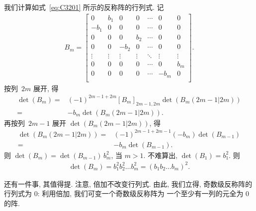 \documentclass[../libro.tex]{subfiles}
\begin{document}
我们计算如式~\eqref{eq:C3201} 所示的反称阵的行列式.
记
\begin{align*}
    B_m =
    \begin{bmatrix}
        0      & b_1    & 0      & 0      & \cdots & 0      & 0      \\
        -b_1   & 0      & 0      & 0      & \cdots & 0      & 0      \\
        0      & 0      & 0      & b_2    & \cdots & 0      & 0      \\
        0      & 0      & -b_2   & 0      & \cdots & 0      & 0      \\
        \vdots & \vdots & \vdots & \vdots & \ddots & \vdots & \vdots \\
        0      & 0      & 0      & 0      & \cdots & 0      & b_m    \\
        0      & 0      & 0      & 0      & \cdots & -b_m   & 0      \\
    \end{bmatrix}.
\end{align*}
按列~\(2m\) 展开, 得
\begin{align*}
    \det {(B_m)}
    = {} &
    (-1)^{2m-1+2m} [B_m]_{2m-1,2m} \det {(B_m ({2m-1}|{2m}))}
    \\
    = {} &
    {-} b_m \det {(B_m ({2m-1}|{2m}))}.
\end{align*}
再按列~\(2m-1\) 展开 \(\det {(B_m ({2m-1}|{2m}))}\), 得
\begin{align*}
    \det {(B_m ({2m-1}|{2m}))}
    = {} &
    (-1)^{2m-1+2m-1} (-b_m) \det {(B_{m-1})}
    \\
    = {} &
    {-} b_m \det {(B_{m-1})}.
\end{align*}
则 \(\det {(B_m)} = \det {(B_{m-1})}\, b_m^2\),
当 \(m > 1\).
不难算出, \(\det {(B_1)} = b_1^2\).
则
\begin{align*}
    \det {(B_m)} = b_1^2 b_2^2 \dots b_m^2
    = (b_1 b_2 \dots b_m)^2.
\end{align*}

还有一件事, 其值得提.
注意, 倍加不改变行列式.
由此, 我们立得, 奇数级反称阵的行列式为 \(0\):
利用倍加, 我们可变一个奇数级反称阵为%
一个至少有一列的元全为 \(0\) 的阵.
\end{document}
